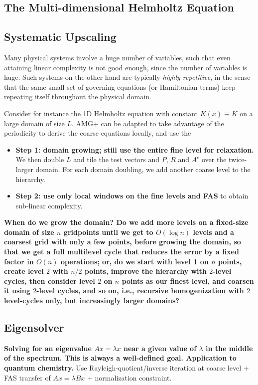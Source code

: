 \documentclass{article}
\begin{document}
\subsection{The Multi-dimensional Helmholtz Equation}
\label{multidim}

\subsection{Systematic Upscaling}
\label{upscaling}
Many physical systems involve a huge number of variables, such that even attaining linear complexity is not good enough, since the number of variables is huge. Such systems on the other hand are typically \emph{highly repetitive}, in the sense that the same small set of governing equations (or Hamiltonian terms) keep repeating itself throughout the physical domain. 

Consider for instance the 1D Helmholtz equation with constant $K(x) \equiv K$ on a large domain of size $L$. AMG+ can be adapted to take advantage of the periodicity to derive the coarse equations locally, and use the 

\begin{itemize}
\item {\bf Step 1: domain growing; still use the entire fine level for relaxation.} We then double $L$ and tile the test vectors and $P$, $R$ and $A^c$ over the twice-larger domain. For each domain doubling, we add another coarse level to the hierarchy. 

\item {\bf Step 2: use only local windows on the fine levels and FAS} to obtain sub-linear complexity.
\end{itemize}

{\bf When do we grow the domain? Do we add more levels on a fixed-size domain of size $n$ gridpoints until we get to $O(\log n)$ levels and a coarsest grid with only a few points, before growing the domain, so that we get a full multilevel cycle that reduces the error by a fixed factor in $O(n)$ operations; or, do we start with level 1 on $n$ points, create level $2$ with $n/2$ points, improve the hierarchy with $2$-level cycles, then consider level $2$ on $n$ points as our finest level, and coarsen it using $2$-level cycles, and so on, i.e., recursive homogenization with $2$ level-cycles only, but increasingly larger domains?}

\subsection{Eigensolver}
{\bf Solving for an eigenvalue $A x = \lambda x$ near a given value of $\lambda$ in the middle of the spectrum. This is always a well-defined goal. Application to quantum chemistry.} Use Rayleigh-quotient/inverse iteration at coarse level + FAS transfer of $A x = \lambda B x$ + normalization constraint.
\end{document}
